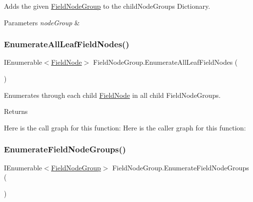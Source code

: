 Adds the given \hyperlink{class_field_node_group}{Field\+Node\+Group} to the child\+Node\+Groups Dictionary. 


\begin{DoxyParams}{Parameters}
{\em node\+Group} & \\
\hline
\end{DoxyParams}
\mbox{\label{class_field_node_group_a3451813e80e498e9614586b2480a7c1f}} 
\subsubsection{\texorpdfstring{Enumerate\+All\+Leaf\+Field\+Nodes()}{EnumerateAllLeafFieldNodes()}}
{\footnotesize\ttfamily I\+Enumerable$<$\hyperlink{class_field_node}{Field\+Node}$>$ Field\+Node\+Group.\+Enumerate\+All\+Leaf\+Field\+Nodes (\begin{DoxyParamCaption}{ }\end{DoxyParamCaption})}



Enumerates through each child \hyperlink{class_field_node}{Field\+Node} in all child Field\+Node\+Groups. 

\begin{DoxyReturn}{Returns}

\end{DoxyReturn}
Here is the call graph for this function\+:
Here is the caller graph for this function\+:
\mbox{\label{class_field_node_group_a63bf1917f33f192088828c1c13991e63}} 
\subsubsection{\texorpdfstring{Enumerate\+Field\+Node\+Groups()}{EnumerateFieldNodeGroups()}}
{\footnotesize\ttfamily I\+Enumerable$<$\hyperlink{class_field_node_group}{Field\+Node\+Group}$>$ Field\+Node\+Group.\+Enumerate\+Field\+Node\+Groups (\begin{DoxyParamCaption}{ }\end{DoxyParamCaption})}



